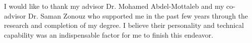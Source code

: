 \begin{dissacknowledgments}
\vspace{-0.4in} 
I would like to thank my advisor Dr. Mohamed Abdel-Mottaleb and my co-advisor Dr. Saman Zonouz who supported me in the past few years through the research and completion of my degree. I believe their personality and technical capability was an indispensable factor for me to finish this endeavor. 
\vspace{-0.3in}
\end{dissacknowledgments}

